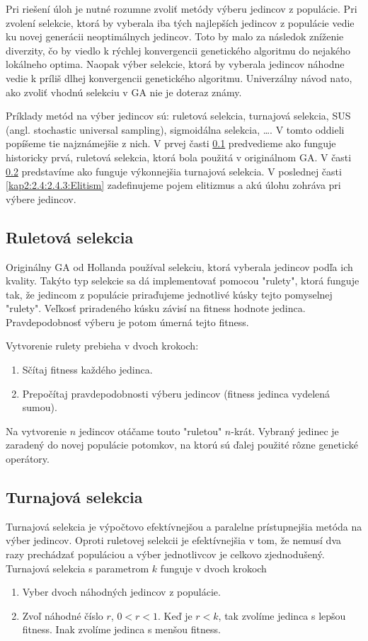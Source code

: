 Pri riešení úloh je nutné rozumne zvoliť metódy výberu jedincov z populácie. Pri zvolení selekcie, ktorá by vyberala iba tých najlepších jedincov z populácie vedie ku novej generácii neoptimálnych jedincov. Toto by malo za následok zníženie diverzity, čo by viedlo k rýchlej konvergencii genetického algoritmu do nejakého lokálneho optima. Naopak výber selekcie, ktorá by vyberala jedincov náhodne vedie k príliš dlhej konvergencii genetického algoritmu. Univerzálny návod nato, ako zvoliť vhodnú selekciu v GA nie je doteraz známy.

Príklady metód na výber jedincov sú: ruletová selekcia, turnajová selekcia, SUS (angl. stochastic universal sampling), sigmoidálna selekcia, \ldots. V tomto oddieli popíšeme tie najznámejšie z nich. V prvej časti \ref{kap2:2.4:2.4.1:RoulletteWheel} predvedieme ako funguje historicky prvá, ruletová selekcia, ktorá bola použitá v originálnom GA. V časti \ref{kap2:2.4:2.4.2:Tournament} predstavíme ako funguje výkonnejšia turnajová selekcia. V poslednej časti \ref{kap2:2.4:2.4.3:Elitism} zadefinujeme pojem elitizmus a akú úlohu zohráva pri výbere jedincov.

\subsection{Ruletová selekcia}\label{kap2:2.4:2.4.1:RoulletteWheel}
Originálny GA od Hollanda používal selekciu, ktorá vyberala jedincov podľa ich kvality. Takýto typ selekcie sa dá implementovať pomocou "rulety", ktorá funguje tak, že jedincom z populácie priraďujeme jednotlivé kúsky tejto pomyselnej "rulety". Veľkosť priradeného kúsku závisí na fitness hodnote jedinca. Pravdepodobnosť výberu je potom úmerná tejto fitness.

Vytvorenie rulety prebieha v dvoch krokoch:
\begin{enumerate}
\item Sčítaj fitness každého jedinca.
\item Prepočítaj pravdepodobnosti výberu jedincov (fitness jedinca vydelená sumou).
\end{enumerate}
Na vytvorenie $n$ jedincov otáčame touto "ruletou" $n$-krát. Vybraný jedinec je zaradený do novej populácie potomkov, na ktorú sú ďalej použité rôzne genetické operátory.
\subsection{Turnajová selekcia}\label{kap2:2.4:2.4.2:Tournament}
Turnajová selekcia je výpočtovo efektívnejšou a paralelne prístupnejšia metóda na výber jedincov. Oproti ruletovej selekcii je efektívnejšia v tom, že nemusí dva razy prechádzať populáciou a výber jednotlivcov je celkovo zjednodušený. Turnajová selekcia s parametrom $k$ funguje v dvoch krokoch
\begin{enumerate}
\item Vyber dvoch náhodných jedincov z populácie.
\item Zvoľ náhodné číslo $r$, $0 < r < 1$. Keď je $r < k$, tak zvolíme jedinca s lepšou fitness. Inak zvolíme jedinca s menšou fitness. 
\end{enumerate} 

